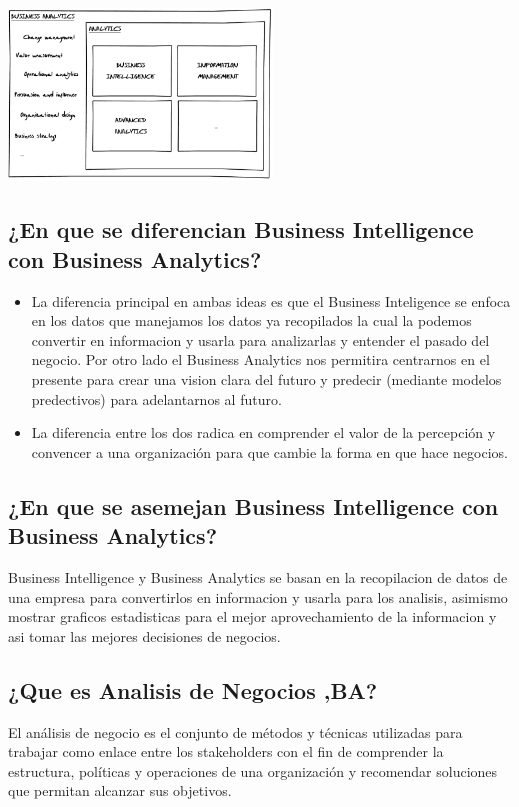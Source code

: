 \documentclass[twoside,twocolumn]{article}
\begin{document}
\begin{center}
	\includegraphics[width=7cm]{./Imagenes/ba} 
\end{center}

\subsection{¿En que se diferencian Business Intelligence con Business Analytics?}
\begin{itemize}	
	\item La diferencia principal en ambas ideas es que el Business Inteligence se enfoca en los datos que manejamos los datos ya recopilados la cual la podemos convertir en informacion y usarla para analizarlas y entender el pasado del negocio. Por otro lado el Business Analytics nos permitira centrarnos en el presente para crear una vision clara del futuro y predecir (mediante modelos predectivos) para adelantarnos al futuro.
	\item La  diferencia entre los dos radica en comprender el valor de la percepción y convencer a una organización para que cambie la forma en que hace negocios.
\end{itemize} 





\subsection{¿En que se asemejan Business Intelligence con Business Analytics?}
Business Intelligence y Business Analytics se basan en la recopilacion de datos de una empresa para convertirlos en informacion y usarla para los analisis, asimismo mostrar graficos estadisticas para el mejor aprovechamiento de la informacion y asi tomar las mejores decisiones de negocios.










\subsection{¿Que es Analisis de Negocios ,BA?}
El análisis de negocio es el conjunto de métodos y técnicas utilizadas para trabajar como enlace entre los stakeholders con el fin de comprender la estructura, políticas y operaciones de una organización y recomendar soluciones que permitan alcanzar sus objetivos.
\end{document}

